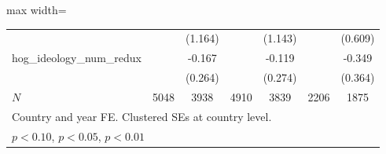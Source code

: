 \begin{table}[htbp]
\begin{adjustbox}{max width=\textwidth}
\begin{tabular}{l*{6}{c}}
            &                     &     (1.164)         &                     &     (1.143)         &                     &     (0.609)         \\
[1em]
hog\_ideology\_num\_redux&                     &      -0.167         &                     &      -0.119         &                     &      -0.349         \\
            &                     &     (0.264)         &                     &     (0.274)         &                     &     (0.364)         \\
\hline
\(N\)       &        5048         &        3938         &        4910         &        3839         &        2206         &        1875         \\
\hline\hline
\multicolumn{7}{l}{\footnotesize Country and year FE. Clustered SEs at country level.}\\
\multicolumn{7}{l}{\footnotesize \sym{*} \(p<0.10\), \sym{**} \(p<0.05\), \sym{***} \(p<0.01\)}\\
\end{tabular}
\end{adjustbox}
\end{table}
